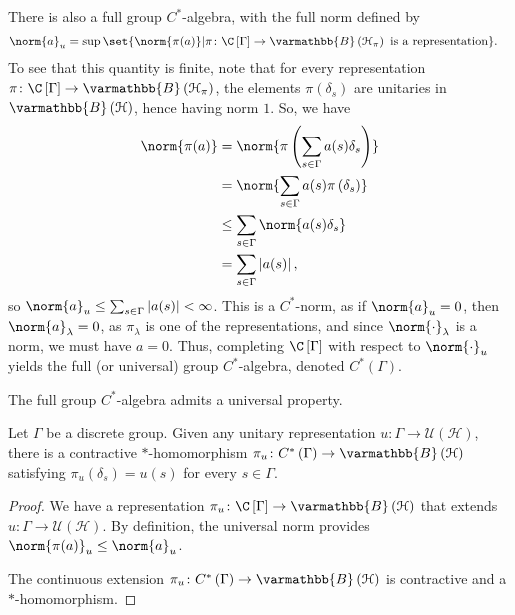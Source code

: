 \documentclass[10pt]{mypackage}
\renewcommand*{\mathbb}[1]{\varmathbb{#1}}
\newcommand{\B}{\mathbb{B}}
\begin{document}
There is also a full group $C^{\ast}$-algebra, with the full norm defined by
\begin{align*}
  \norm{a}_{u} &= \sup\set{\norm{\pi(a)} | \pi\colon \C\left[\Gamma\right]\rightarrow \B\left(\mathcal{H}_{\pi}\right)\text{ is a representation}}.
\end{align*}
To see that this quantity is finite, note that for every representation $\pi\colon \C\left[\Gamma\right]\rightarrow \B\left(\mathcal{H}_{\pi}\right)$, the elements $\pi\left(\delta_s\right)$ are unitaries in $\B\left(\mathcal{H}\right)$, hence having norm $1$. So, we have
\begin{align*}
  \norm{\pi(a)} &= \norm{\pi\left(\sum_{s\in\Gamma}a(s)\delta_s\right)}\\
                &= \norm{\sum_{s\in\Gamma}a(s)\pi\left(\delta_s\right)}\\
                &\leq \sum_{s\in\Gamma}\norm{a(s)\delta_s}\\
                &= \sum_{s\in\Gamma}\left\vert a(s) \right\vert,
\end{align*}
so $\norm{a}_{u}\leq \sum_{s\in\Gamma}\left\vert a(s) \right\vert < \infty$. This is a $C^{\ast}$-norm, as if $\norm{a}_{u} = 0$, then $\norm{a}_{\lambda}=0$, as $\pi_{\lambda}$ is one of the representations, and since $\norm{\cdot}_{\lambda}$ is a norm, we must have $a = 0$. Thus, completing $\C\left[\Gamma\right]$ with respect to $\norm{\cdot}_u$ yields the full (or universal) group $C^{\ast}$-algebra, denoted $C^{\ast}\left(\Gamma\right)$.\newline

The full group $C^{\ast}$-algebra admits a universal property.
\begin{proposition}
  Let $\Gamma$ be a discrete group. Given any unitary representation $u\colon \Gamma\rightarrow \mathcal{U}\left(\mathcal{H}\right)$, there is a contractive $\ast$-homomorphism $\pi_u\colon C^{\ast}\left(\Gamma\right)\rightarrow \B\left(\mathcal{H}\right)$ satisfying $\pi_u\left(\delta_s\right) = u(s)$ for every $s\in\Gamma$.
\end{proposition}
\begin{proof}
  We have a representation $\pi_u\colon \C\left[\Gamma\right]\rightarrow \B\left(\mathcal{H}\right)$ that extends $u\colon \Gamma\rightarrow \mathcal{U}\left(\mathcal{H}\right)$. By definition, the universal norm provides $\norm{\pi(a)}_{u} \leq \norm{a}_u$.\newline

  The continuous extension $\pi_u\colon C^{\ast}\left(\Gamma\right)\rightarrow \B\left(\mathcal{H}\right)$ is contractive and a $\ast$-homomorphism.
\end{proof}
\end{document}
